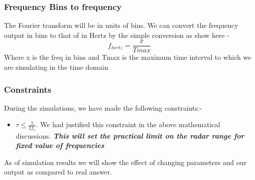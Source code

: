 \documentclass[12pt]{article}
\begin{document}
\subsubsection*{Frequency Bins to frequency}
The Fourier transform will be in units of bins. We can convert the frequency output in bins to that of in Hertz by the simple conversion as show here - 
\[f_{hertz} = \frac{x}{Tmax}\]
Where x is the freq in bins and Tmax is the maximum time interval to which we are simulating in the time domain
\subsubsection*{Constraints}
During the simulations, we have made the following constraints:-
\begin{itemize}
    \item $\tau \leq \frac{1}{2f_o}$. We had justified this constraint in the above mathematical discussions. \textbf{\textit{This will set the practical limit on the radar range for fixed value of frequencies}}
\end{itemize}
\begin{flushleft}
As of simulation results we will show the effect of changing parameters and our output as compared to real answer.
\end{flushleft}
\end{document}
